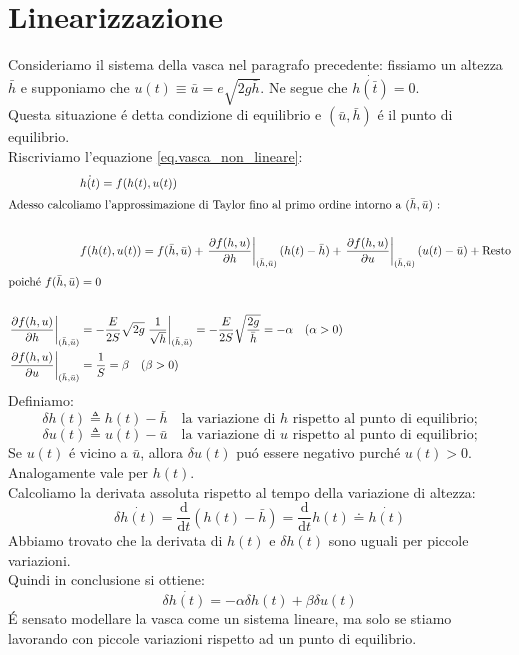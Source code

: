 \documentclass[../main.tex]{subfiles}
\begin{document}
	\section{Linearizzazione}
		Consideriamo il sistema della vasca nel paragrafo precedente: fissiamo un altezza $ \bar{h} $ e supponiamo che $u(t) \equiv \bar{u} = e \sqrt{2g \bar{h}}$. Ne segue che $ \dot{h(\bar{t})} =0 $.\\
		Questa situazione \'e detta condizione di equilibrio e $( \bar{u} , \bar{h}) $ \'e il punto di equilibrio.\\
		Riscriviamo l'equazione \ref{eq.vasca_non_lineare}:
		\begin{align*}	
				&\dot{h(t)} = f(h(t),u(t))\\		
				\intertext{Adesso calcoliamo l'approssimazione di Taylor fino al primo ordine intorno a $ (\bar{h},\bar{u}) $ :} \\
				&f(h(t),u(t)) = f(\bar{h},\bar{u}) + \left. \frac{\partial f(h,u)}{\partial h} \right|_{(\bar{h},\bar{u})} (h(t) - \bar{h}) + \left. \frac{\partial f(h,u)}{\partial u} \right|_{(\bar{h},\bar{u})} (u(t) - \bar{u}) + \mbox{Resto}\\
				\intertext{poich\'e $ f(\bar{h},\bar{u}) =0$}\\
				\left. \frac{\partial f(h,u)}{\partial h} \right|_{(\bar{h},\bar{u})} &= - \frac{E}{2S} \sqrt{2g} \left. \frac{1}{\sqrt{h}} \right|_{(\bar{h},\bar{u})} = - \frac{E}{2S} \sqrt{\frac{2g}{\bar{h}}} = - \alpha \quad (\alpha > 0)\\
				\left. \frac{\partial f(h,u)}{\partial u} \right|_{(\bar{h},\bar{u})} &= \frac{1}{S} = \beta \quad (\beta > 0)  
		\end{align*}
		Definiamo:
		\[ \delta h(t) \triangleq h(t)- \bar{h} \quad \text{la variazione di $h$ rispetto al punto di equilibrio;} \]
		\[ \delta u(t) \triangleq u(t)- \bar{u} \quad \text{la variazione di $u$ rispetto al punto di equilibrio;} \]
		Se $u(t)$ \'e vicino a $\bar{u}$, allora $\delta u(t)$ pu\'o essere negativo purch\'e $u(t)>0$. Analogamente vale per $h(t)$.\\
		Calcoliamo la derivata assoluta rispetto al tempo della variazione di altezza:
		\[ \delta \dot{h(t)} = \frac{\mathrm{d}}{\mathrm{d} t}(h(t)-\bar{h}) = \frac{\mathrm{d}}{\mathrm{d} t}h(t) \doteq \dot{h(t)} \] 
		Abbiamo trovato che la derivata di $h(t)$ e $\delta h(t)$ sono uguali per piccole variazioni.\\
		Quindi in conclusione si ottiene:
		\begin{equation}
			\delta \dot{h(t)} = -\alpha \delta h(t) + \beta \delta u(t)
		\end{equation}
		\'E sensato modellare la vasca come un sistema lineare, ma solo se stiamo lavorando con piccole variazioni rispetto ad un punto di equilibrio.
\end{document}
